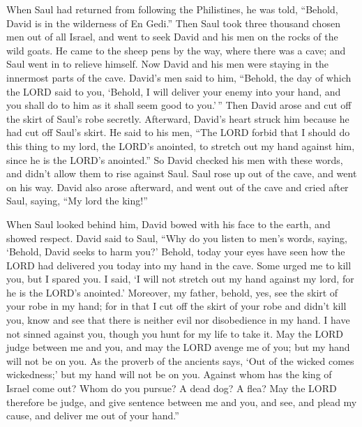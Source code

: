  When Saul had returned from following the Philistines, he
was told, ``Behold, David is in the wilderness of En Gedi.''
 Then Saul took three thousand chosen men out of all
Israel, and went to seek David and his men on the rocks of the wild
goats.  He came to the sheep pens by the way, where there
was a cave; and Saul went in to relieve himself. Now David and his men
were staying in the innermost parts of the cave.  David's
men said to him, ``Behold, the day of which the LORD said to you,
`Behold, I will deliver your enemy into your hand, and you shall do to
him as it shall seem good to you.'\,'' Then David arose and cut off the
skirt of Saul's robe secretly.  Afterward, David's heart
struck him because he had cut off Saul's skirt.  He said
to his men, ``The LORD forbid that I should do this thing to my lord,
the LORD's anointed, to stretch out my hand against him, since he is the
LORD's anointed.''  So David checked his men with these
words, and didn't allow them to rise against Saul. Saul rose up out of
the cave, and went on his way.  David also arose
afterward, and went out of the cave and cried after Saul, saying, ``My
lord the king!''

When Saul looked behind him, David bowed with his face to the earth, and
showed respect.  David said to Saul, ``Why do you listen
to men's words, saying, `Behold, David seeks to harm you?'
 Behold, today your eyes have seen how the LORD had
delivered you today into my hand in the cave. Some urged me to kill you,
but I spared you. I said, `I will not stretch out my hand against my
lord, for he is the LORD's anointed.'  Moreover, my
father, behold, yes, see the skirt of your robe in my hand; for in that
I cut off the skirt of your robe and didn't kill you, know and see that
there is neither evil nor disobedience in my hand. I have not sinned
against you, though you hunt for my life to take it.  May
the LORD judge between me and you, and may the LORD avenge me of you;
but my hand will not be on you.  As the proverb of the
ancients says, `Out of the wicked comes wickedness;' but my hand will
not be on you.  Against whom has the king of Israel come
out? Whom do you pursue? A dead dog? A flea?  May the
LORD therefore be judge, and give sentence between me and you, and see,
and plead my cause, and deliver me out of your hand.''


